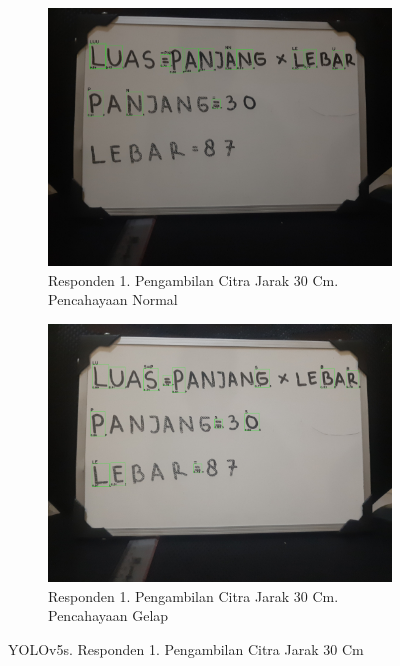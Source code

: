 \begin{figure}[H]
  \begin{subfigure}{.5\textwidth}
    \centering
    \captionsetup{width=.8\linewidth}
    \includegraphics[width=.8\linewidth]{gambar/yolov5s/responden1/dinda30cm00-result.jpg}
    \caption{Responden 1. Pengambilan Citra Jarak 30 Cm. Pencahayaan Normal}
    \label{fig:sr1tcitra30cm}
  \end{subfigure}%
  \begin{subfigure}{.5\textwidth}
    \centering
    \captionsetup{width=.8\linewidth}
    \includegraphics[width=.8\linewidth]{gambar/yolov5s/responden1/dinda30cm10-result.jpg}
    \caption{Responden 1. Pengambilan Citra Jarak 30 Cm. Pencahayaan Gelap}
    \label{fig:sr1gcitra30cm}
  \end{subfigure}
  \caption{YOLOv5s. Responden 1. Pengambilan Citra Jarak 30 Cm}
  \label{fig:sr1citra30cm}
\end{figure}

